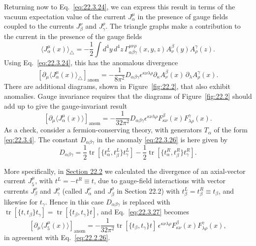 Returning now to Eq.~\eqref{eq:22.3.24}, we can express this result in terms
of the vacuum expectation value of the current $J_\alpha^\mu$ in the
presence of gauge fields coupled to the currents $J_\beta^\nu$ and
$J_\gamma^\rho$. The triangle graphs make a contribution to the current in
the presence of the gauge fields
\begin{equation}
 \bigl\langle J_\alpha^\mu(x)\bigr\rangle_\triangle
 =-\frac12\int d^4y\,d^4z\,
 \Gamma_{\alpha\beta\gamma}^{\mu\nu\rho}(x,y,z)
 A_\nu^\beta(y)A_\rho^\gamma(z).
 \tag{22.3.25}\label{eq:22.3.25}
\end{equation}
Using Eq.~\eqref{eq:22.3.24}, this has the anomalous divergence
\begin{equation}
 \left[
  \partial_\mu\bigl\langle J_\alpha^\mu(x)\bigr\rangle_\triangle
 \right]_{\mathrm{anom}}
 =-\frac{1}{8\pi^2}D_{\alpha\beta\gamma}
 \epsilon^{\kappa\nu\lambda\rho}
 \partial_\kappa A_\nu^\beta(x)\,
 \partial_\lambda A_\rho^\gamma(x).
 \tag{22.3.26}\label{eq:22.3.26}
\end{equation}
There are additional diagrams, shown in Figure~\ref{fig:22.2}, that also
exhibit anomalies. Gauge invariance requires that the diagrams of
Figure~\ref{fig:22.2} should add up to give the gauge-invariant result
\begin{equation}
 \left[
  \partial_\mu\bigl\langle J_\alpha^\mu(x)\bigr\rangle
 \right]_{\mathrm{anom}}
 =-\frac{1}{32\pi^2}D_{\alpha\beta\gamma}
 \epsilon^{\kappa\nu\lambda\rho}
 F_{\kappa\nu}^\beta(x)F_{\lambda\rho}^\gamma(x).
 \tag{22.3.27}\label{eq:22.3.27}
\end{equation}
As a check, consider a fermion-conserving theory, with generators
$T_\alpha$ of the form \eqref{eq:22.3.4}. The constant
$D_{\alpha\beta\gamma}$ in the anomaly \eqref{eq:22.3.26} is here given by
\begin{equation}
 D_{\alpha\beta\gamma}
 =\frac12\operatorname{tr}
 \left[\{t_\alpha^L,t_\beta^L\}t_\gamma^L\right]
 -\frac12\operatorname{tr}
 \left[\{t_\alpha^R,t_\beta^R\}t_\gamma^R\right].
 \tag{22.3.28}\label{eq:22.3.28}
\end{equation}



More specifically, in \hyperref[sec:22.2]{Section 22.2} we calculated the
divergence of an axial-vector current $J_5^\mu$, with
$t^L=-t^R\equiv t$, due to gauge-field interactions with vector currents
$J_\beta^\nu$ and $J_\gamma^\rho$ (called $J_\alpha^\nu$ and
$J_\beta^\rho$ in Section 22.2) with
$t_\beta^L=t_\beta^R\equiv t_\beta$, and likewise for $t_\gamma$. Hence in
this case $D_{\alpha\beta\gamma}$ is replaced with
$\operatorname{tr}[\{t,t_\beta\}t_\gamma]
=\operatorname{tr}[\{t_\beta,t_\gamma\}t]$, and Eq.~\eqref{eq:22.3.27}
becomes
\begin{equation}
 \left[
  \partial_\mu\bigl\langle J_5^\mu(x)\bigr\rangle
 \right]_{\mathrm{anom}}
 =-\frac{1}{32\pi^2}
 \operatorname{tr}[\{t_\beta,t_\gamma\}t]\,
 \epsilon^{\kappa\nu\lambda\rho}
 F_{\kappa\nu}^\beta(x)F_{\lambda\rho}^\gamma(x),
 \tag{22.3.29}\label{eq:22.3.29}
\end{equation}
in agreement with Eq.~\eqref{eq:22.2.26}.

